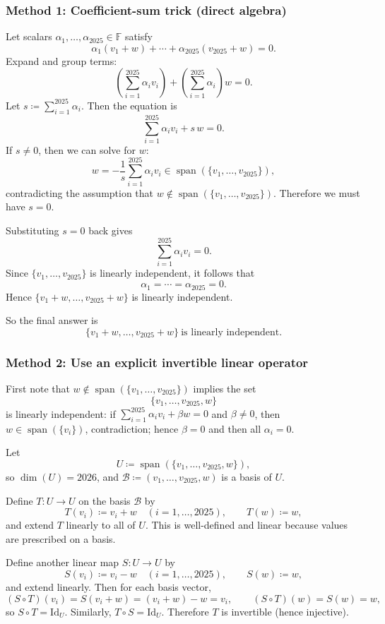 \documentclass[12pt]{article}
\newcommand{\F}{\mathbb{F}}
\newcommand{\Span}{\operatorname{span}}
\newcommand{\dimn}{\operatorname{dim}}
\begin{document}
\subsubsection{Method 1: Coefficient-sum trick (direct algebra)}
Let scalars \(\alpha_1,\ldots,\alpha_{2025}\in\F\) satisfy
\[
\alpha_1(v_1+w)+\cdots+\alpha_{2025}(v_{2025}+w)=0.
\]
Expand and group terms:
\[
\left(\sum_{i=1}^{2025}\alpha_i v_i\right) + \left(\sum_{i=1}^{2025}\alpha_i\right) w=0.
\]
Let \(s\coloneqq \sum_{i=1}^{2025}\alpha_i\).
Then the equation is
\[
\sum_{i=1}^{2025}\alpha_i v_i + s\,w=0.
\]
If \(s\neq 0\), then we can solve for \(w\):
\[
w = -\frac{1}{s}\sum_{i=1}^{2025}\alpha_i v_i \in \Span(\{v_1,\ldots,v_{2025}\}),
\]
contradicting the assumption that \(w\notin \Span(\{v_1,\ldots,v_{2025}\})\).
Therefore we must have \(s=0\).

Substituting \(s=0\) back gives
\[
\sum_{i=1}^{2025}\alpha_i v_i=0.
\]
Since \(\{v_1,\ldots,v_{2025}\}\) is linearly independent, it follows that
\[
\alpha_1=\cdots=\alpha_{2025}=0.
\]
Hence \(\{v_1+w,\ldots,v_{2025}+w\}\) is linearly independent.

So the final answer is
\[
\boxed{\,\{v_1+w,\ldots,v_{2025}+w\}\ \text{is linearly independent.}\,}
\]

\subsubsection{Method 2: Use an explicit invertible linear operator}
First note that \(w\notin\Span(\{v_1,\ldots,v_{2025}\})\) implies the set
\[
\{v_1,\ldots,v_{2025},w\}
\]
is linearly independent: if \(\sum_{i=1}^{2025}\alpha_i v_i+\beta w=0\) and \(\beta\neq 0\), then \(w\in\Span(\{v_i\})\), contradiction; hence \(\beta=0\) and then all \(\alpha_i=0\).

Let
\[
U \coloneqq \Span(\{v_1,\ldots,v_{2025},w\}),
\]
so \(\dimn(U)=2026\), and \(\mathcal{B}\coloneqq (v_1,\ldots,v_{2025},w)\) is a basis of \(U\).

Define \(T:U\to U\) on the basis \(\mathcal{B}\) by
\[
T(v_i)\coloneqq v_i+w \quad (i=1,\ldots,2025),
\qquad
T(w)\coloneqq w,
\]
and extend \(T\) linearly to all of \(U\).
This is well-defined and linear because values are prescribed on a basis.

Define another linear map \(S:U\to U\) by
\[
S(v_i)\coloneqq v_i-w \quad (i=1,\ldots,2025),
\qquad
S(w)\coloneqq w,
\]
and extend linearly.
Then for each basis vector,
\[
(S\circ T)(v_i)=S(v_i+w)=(v_i+w)-w=v_i,\qquad (S\circ T)(w)=S(w)=w,
\]
so \(S\circ T=\mathrm{Id}_U\).
Similarly, \(T\circ S=\mathrm{Id}_U\).
Therefore \(T\) is invertible (hence injective).
\end{document}
